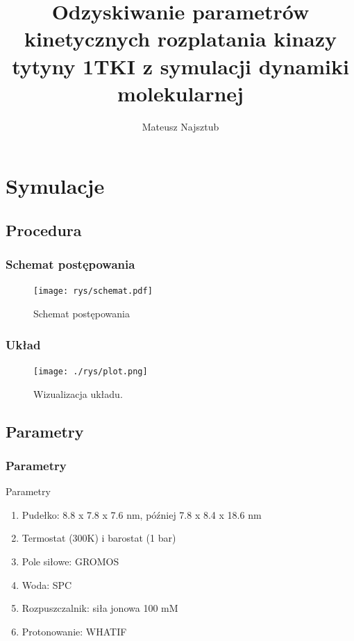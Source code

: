 \documentclass[10pt]{beamer}
\author{Mateusz Najsztub}
\title{Odzyskiwanie parametrów kinetycznych rozplatania kinazy tytyny 1TKI z symulacji dynamiki molekularnej}
\begin{document}
\begin{frame}[plain]

\titlepage
\end{frame}


\section{Symulacje}

\subsection{Procedura}

\begin{frame}
\frametitle{Schemat postępowania}
	\begin{figure}
		\texttt{[image: rys/schemat.pdf]} 
		\caption{Schemat postępowania}
	\end{figure}
\end{frame}

\begin{frame}
\frametitle{Układ}
\begin{center}
\begin{figure}[h]
\begin{centering}
\texttt{[image: ./rys/plot.png]}
\caption{Wizualizacja układu.}
\end{centering}
\end{figure}
\end{center}
\end{frame}

\subsection{Parametry}



\begin{frame}
\frametitle{Parametry}
\begin{block}{Parametry}
\begin{enumerate}
\item Pudełko: 8.8 x 7.8 x 7.6 nm, później 7.8 x 8.4 x 18.6 nm
\item Termostat (300K) i barostat (1 bar)
\item Pole siłowe: GROMOS
\item Woda: SPC
\item Rozpuszczalnik: siła jonowa 100 mM
\item Protonowanie: WHATIF
\end{enumerate}

\end{block}
\end{frame}
\end{document}
